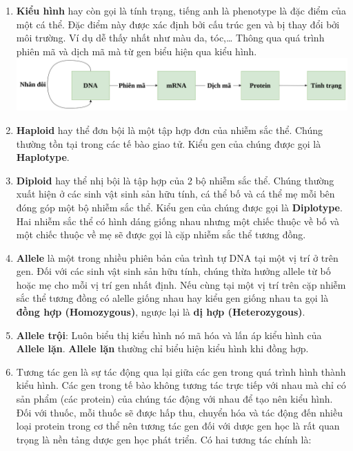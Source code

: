 \documentclass[14pt,oneside]{scrbook}
\providecommand{\tightlist}{\setlength{\itemsep}{\smallskipamount}\setlength{\parskip}{\smallskipamount}}
\begin{document}
\begin{enumerate}
\def\labelenumi{\arabic{enumi})}
\setcounter{enumi}{5}
\tightlist
\item
  \textbf{Kiểu hình} hay còn gọi là tính trạng, tiếng anh là phenotype
  là đặc điểm của một cá thể. Đặc điểm này được xác định bởi cấu trúc
  gen và bị thay đổi bởi môi trường. Ví dụ dễ thấy nhất như màu da,
  tóc,\ldots{} Thông qua quá trình phiên mã và dịch mã mà từ gen biểu
  hiện qua kiểu hình. \includegraphics{image/geno2pheno.png}
\item
  \textbf{Haploid} hay thể đơn bội là một tập hợp đơn của nhiễm sắc thể.
  Chúng thường tồn tại trong các tế bào giao tử. Kiểu gen của chúng được
  gọi là \textbf{Haplotype}.
\item
  \textbf{Diploid} hay thể nhị bội là tập hợp của 2 bộ nhiễm sắc thể.
  Chúng thường xuất hiện ở các sinh vật sinh sản hữu tính, cá thể bố và
  cá thể mẹ mỗi bên đóng góp một bộ nhiễm sắc thể. Kiểu gen của chúng
  được gọi là \textbf{Diplotype}. Hai nhiễm sắc thể có hình dáng giống
  nhau nhưng một chiếc thuộc về bố và một chiếc thuộc về mẹ sẽ được gọi
  là cặp nhiễm sắc thể tương đồng.
\item
  \textbf{Allele} là một trong nhiều phiên bản của trình tự DNA tại một
  vị trí ở trên gen. Đối với các sinh vật sinh sản hữu tính, chúng thừa
  hưởng allele từ bố hoặc mẹ cho mỗi vị trí gen nhất định. Nếu cùng tại
  một vị trí trên cặp nhiễm sắc thể tương đồng có alelle giống nhau hay
  kiểu gen giống nhau ta gọi là \textbf{đồng hợp (Homozygous)}, ngược
  lại là \textbf{dị hợp (Heterozygous)}.
\item
  \textbf{Allele trội}: Luôn biểu thị kiểu hình nó mã hóa và lấn áp kiểu
  hình của \textbf{Allele lặn}. \textbf{Allele lặn} thường chỉ biểu hiện
  kiểu hình khi đồng hợp.
\item
  Tương tác gen là sự tác động qua lại giữa các gen trong quá trình hình
  thành kiểu hình. Các gen trong tế bào không tương tác trực tiếp với
  nhau mà chỉ có sản phẩm (các protein) của chúng tác động với nhau để
  tạo nên kiểu hình. Đối với thuốc, mỗi thuốc sẽ được hấp thu, chuyển
  hóa và tác động đến nhiều loại protein trong cơ thể nên tương tác gen
  đối với dược gen học là rất quan trọng là nền tảng dược gen học phát
  triển. Có hai tương tác chính là:


\end{enumerate}
\end{document}
